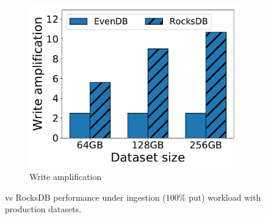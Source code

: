 \begin{figure}[tb]
\begin{subfigure}{0.29\linewidth}
\includegraphics[width=\textwidth]{figs/write_amp_256.pdf}
\caption{Write amplification}
\label{fig:prod:ingestion:c}
\end{subfigure}
\caption{\sys\/ vs RocksDB performance under ingestion (100\% put) workload with production datasets.}
\label{fig:prod:ingestion}
\end{figure}

